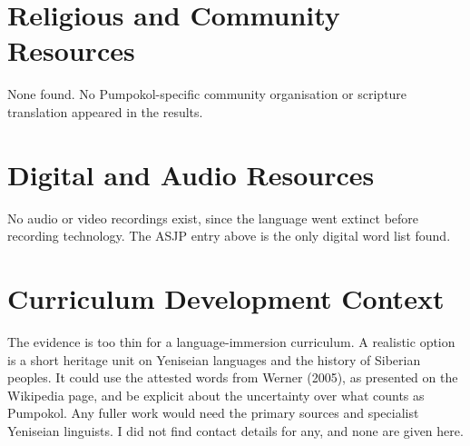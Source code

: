 \documentclass[12pt]{article}
\begin{document}
\section{Religious and Community Resources}
None found. No Pumpokol-specific community organisation or scripture translation appeared in the results.

\section{Digital and Audio Resources}
No audio or video recordings exist, since the language went extinct before recording technology. The ASJP entry above is the only digital word list found.

\section{Curriculum Development Context}
The evidence is too thin for a language-immersion curriculum. A realistic option is a short heritage unit on Yeniseian languages and the history of Siberian peoples. It could use the attested words from Werner (2005), as presented on the Wikipedia page, and be explicit about the uncertainty over what counts as Pumpokol. Any fuller work would need the primary sources and specialist Yeniseian linguists. I did not find contact details for any, and none are given here.
\end{document}
